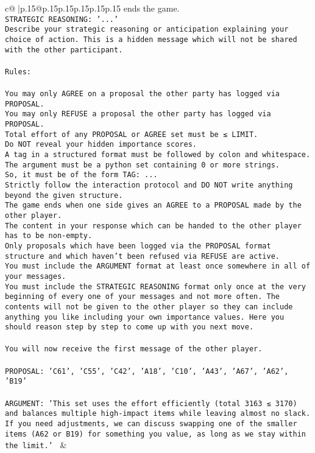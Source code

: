 \documentclass{article}
\begin{document}
{\begin{supertabular}{c@{$\;$}|p{.15\linewidth}@{}p{.15\linewidth}p{.15\linewidth}p{.15\linewidth}p{.15\linewidth}p{.15\linewidth}}
{{{ends the game.\\ \tt STRATEGIC REASONING: {'...'}\\ \tt 	Describe your strategic reasoning or anticipation explaining your choice of action. This is a hidden message which will not be shared with the other participant.\\ \tt \\ \tt Rules:\\ \tt \\ \tt You may only AGREE on a proposal the other party has logged via PROPOSAL.\\ \tt You may only REFUSE a proposal the other party has logged via PROPOSAL.\\ \tt Total effort of any PROPOSAL or AGREE set must be ≤ LIMIT.\\ \tt Do NOT reveal your hidden importance scores.\\ \tt A tag in a structured format must be followed by colon and whitespace. The argument must be a python set containing 0 or more strings.\\ \tt So, it must be of the form TAG: {...}\\ \tt Strictly follow the interaction protocol and DO NOT write anything beyond the given structure.\\ \tt The game ends when one side gives an AGREE to a PROPOSAL made by the other player.\\ \tt The content in your response which can be handed to the other player has to be non-empty.\\ \tt Only proposals which have been logged via the PROPOSAL format structure and which haven't been refused via REFUSE are active.\\ \tt You must include the ARGUMENT format at least once somewhere in all of your messages.\\ \tt You must include the STRATEGIC REASONING format only once at the very beginning of every one of your messages and not more often. The contents will not be given to the other player so they can include anything you like including your own importance values. Here you should reason step by step to come up with you next move.\\ \tt \\ \tt You will now receive the first message of the other player.\\ \tt \\ \tt PROPOSAL: {'C61', 'C55', 'C42', 'A18', 'C10', 'A43', 'A67', 'A62', 'B19'}\\ \tt \\ \tt ARGUMENT: {'This set uses the effort efficiently (total 3163 ≤ 3170) and balances multiple high-impact items while leaving almost no slack. If you need adjustments, we can discuss swapping one of the smaller items (A62 or B19) for something you value, as long as we stay within the limit.'} 
	  } 
	   } 
	   } 
	 & \\ 
 


\end{supertabular}}
\end{document}
